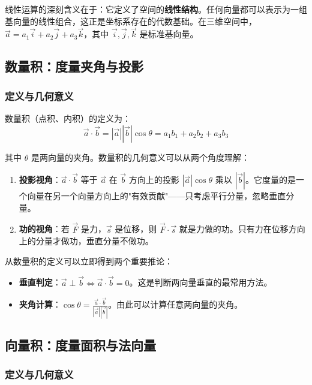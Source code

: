线性运算的深刻含义在于：它定义了空间的\textbf{线性结构}。任何向量都可以表示为一组基向量的线性组合，这正是坐标系存在的代数基础。在三维空间中，$\vec{a} = a_1\vec{i} + a_2\vec{j} + a_3\vec{k}$，其中 $\vec{i}, \vec{j}, \vec{k}$ 是标准基向量。

\subsection{数量积：度量夹角与投影}

\subsubsection{定义与几何意义}

数量积（点积、内积）的定义为：
\[
\vec{a} \cdot \vec{b} = |\vec{a}||\vec{b}|\cos\theta = a_1 b_1 + a_2 b_2 + a_3 b_3
\]

其中 $\theta$ 是两向量的夹角。数量积的几何意义可以从两个角度理解：

\begin{enumerate}[leftmargin=2em]
    \item \textbf{投影视角}：$\vec{a} \cdot \vec{b}$ 等于 $\vec{a}$ 在 $\vec{b}$ 方向上的投影 $|\vec{a}|\cos\theta$ 乘以 $|\vec{b}|$。它度量的是一个向量在另一个向量方向上的"有效贡献"——只考虑平行分量，忽略垂直分量。
    \item \textbf{功的视角}：若 $\vec{F}$ 是力，$\vec{s}$ 是位移，则 $\vec{F}\cdot\vec{s}$ 就是力做的功。只有力在位移方向上的分量才做功，垂直分量不做功。
\end{enumerate}

从数量积的定义可以立即得到两个重要推论：
\begin{itemize}[leftmargin=2em]
    \item \textbf{垂直判定}：$\vec{a}\perp\vec{b} \Leftrightarrow \vec{a}\cdot\vec{b}=0$。这是判断两向量垂直的最常用方法。
    \item \textbf{夹角计算}：$\cos\theta = \frac{\vec{a}\cdot\vec{b}}{|\vec{a}||\vec{b}|}$。由此可以计算任意两向量的夹角。
\end{itemize}

\subsection{向量积：度量面积与法向量}

\subsubsection{定义与几何意义}

